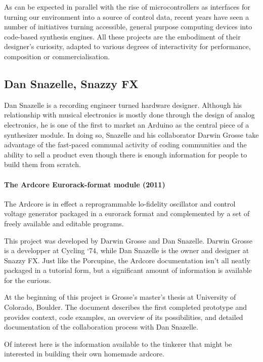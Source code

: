 As can be expected in parallel with the rise of microcontrollers as interfaces for turning our environment into a source of control data, recent years have seen a number of initiatives turning accessible, general purpose computing devices into code-based synthesis engines. All these projects are the embodiment of their designer's curiosity, adapted to various degrees of interactivity for performance, composition or commercialisation. 

\subsection{Dan Snazelle, Snazzy FX}

Dan Snazelle is a recording engineer turned hardware designer. Although his relationship with musical electronics is mostly done through the design of analog electronics, he is one of the first to market an Arduino as the central piece of a synthesizer module. In doing so, Snazelle and his collaborator Darwin Grosse take advantage of the fast-paced communal activity of coding communities and the ability to sell a product even though there is enough information for people to build them from scratch. 

\paragraph{The Ardcore Eurorack-format module (2011)}

The Ardcore is in effect a reprogrammable lo-fidelity oscillator and control voltage generator packaged in a eurorack format and complemented by a set of freely available and editable programs. 

This project was developed by Darwin Grosse and Dan Snazelle. Darwin Grosse is a developper at Cycling `74, while Dan Snazelle is the owner and designer at Snazzy FX. Just like the Porcupine, the Ardcore documentation isn't all neatly packaged in a tutorial form, but a significant amount of  information is available for the curious. 

At the beginning of this project is Grosse's master's thesis at University of Colorado, Boulder. The document describes the first completed prototype and provides context, code examples, an overview of its possibilities, and detailed documentation of the collaboration process with Dan Snazelle. 

Of interest here is the information available to the tinkerer that might be interested in building their own homemade ardcore. 

